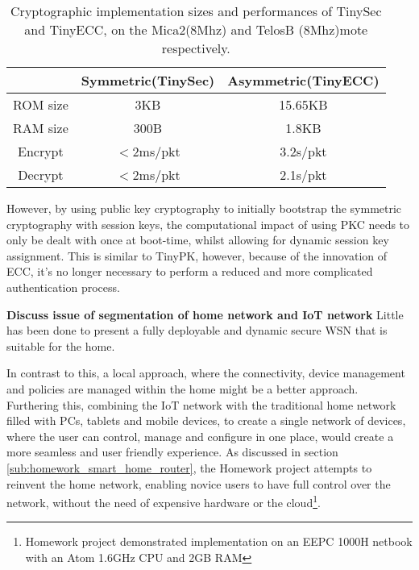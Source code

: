 \documentclass{mprop}
\begin{document}
\begin{table}[h] %
  \begin{center} 
  \begin{tabular}{|c|c|c|} 
  \hline
           & Symmetric(TinySec) & Asymmetric(TinyECC) \\ \hline
  ROM size & 3KB                & 15.65KB \\ \hline
  RAM size & 300B               & 1.8KB \\ \hline
  Encrypt  & $<$2ms/pkt         & 3.2s/pkt \\ \hline 
  Decrypt  & $<$2ms/pkt         & 2.1s/pkt \\ \hline
  \end{tabular}
  \caption[]{Cryptographic implementation sizes and performances of TinySec and TinyECC, on the Mica2(8Mhz) and TelosB (8Mhz)mote respectively\footnotemark. \cite{TinySec,TinyECC}}
  \label{tab:crypto_compare}
  \end{center}
\end{table}


However, by using public key cryptography to initially bootstrap the symmetric cryptography with session keys, the computational impact of using PKC needs to only be dealt with once at boot-time, whilst allowing for dynamic session key assignment. This is similar to TinyPK, however, because of the innovation of ECC, it's no longer necessary to perform a reduced and more complicated authentication process\cite{TinyPK}.

\textbf{Discuss issue of segmentation of home network and IoT network}
Little has been done to present a fully deployable and dynamic secure WSN that is suitable for the home. 

In contrast to this, a local approach, where the connectivity, device management and policies are managed within the home might be a better approach. Furthering this, combining the IoT network with the traditional home network filled with PCs, tablets and mobile devices, to create a single network of devices, where the user can control, manage and configure in one place, would create a more seamless and user friendly experience. As discussed in section \ref{sub:homework_smart_home_router}, the Homework project attempts to reinvent the home network, enabling novice users to have full control over the network, without the need of expensive hardware or the cloud\footnote{Homework project demonstrated implementation on an EEPC 1000H netbook with an Atom 1.6GHz CPU and 2GB RAM}. 
\end{document}
